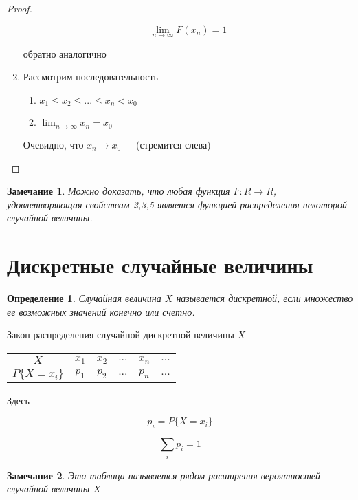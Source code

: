 \documentclass[a4paper, 14pt]{report}
\newtheorem{defenition}{Определение}[chapter]
\newtheorem{note}{Замечание}[chapter]
\begin{document}
\begin{proof}
\begin{enumerate}
            $$
            \lim_{n \to \infty} F(x_n) = 1
            $$

            обратно аналогично

        \item Рассмотрим последовательность

            \begin{enumerate}
                \item $x_1 \le x_2 \le ... \le x_n < x_0$
                \item $\lim_{n \to \infty} x_n = x_0$
            \end{enumerate}

            Очевидно, что $x_n \to x_0 -$ (стремится слева)
    \end{enumerate}
\end{proof}

\begin{note}
    Можно доказать, что любая функция $F : R \to R$, удовлетворяющая свойствам 2,3,5 является функцией распределения некоторой случайной величины. 
\end{note}

\section{Дискретные случайные величины}

\begin{defenition}
    Случайная величина $X$ называется дискретной, если множество ее возможных значений конечно или счетно.
\end{defenition}

Закон распределения случайной дискретной величины $X$

\begin{tabular}{c|c|c|c|c|c}
    \hline
    $X$ & $x_1$ & $x_2$ & $...$ & $x_n$ & $...$ \\
    \hline
    $P\{X = x_i\}$ & $p_1$ & $p_2$ & $...$ & $p_n$ & $...$ \\
    \hline
\end{tabular}

Здесь

$$
p_i = P\{X = x_i\}
$$


$$
\sum_i p_i = 1
$$

\begin{note}
    Эта таблица называется рядом расширения вероятностей случайной величины $X$ 
\end{note}
\end{document}
